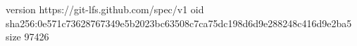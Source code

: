 version https://git-lfs.github.com/spec/v1
oid sha256:0e571c73628767349e5b2023bc63508c7ca75dc198d6d9e288248c416d9e2ba5
size 97426
